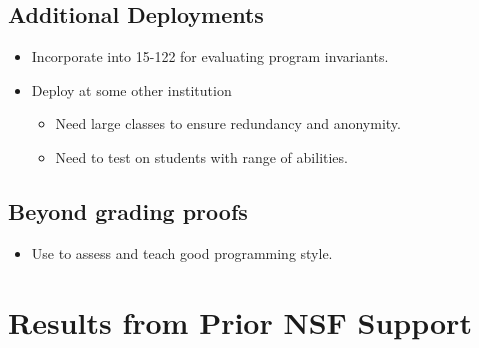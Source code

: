 \documentclass[12pt]{article}
\begin{document}
\subsection{Additional Deployments}

\begin{itemize}
\item Incorporate into 15-122 for evaluating program invariants.  
\item Deploy at some other institution
\begin{itemize}
\item Need large classes to ensure redundancy and anonymity.
\item Need to test on students with range of abilities.
\end{itemize}
\end{itemize}

\subsection{Beyond grading proofs}

\begin{itemize}
\item Use to assess and teach good programming style.
\end{itemize}

\section{Results from Prior NSF Support}


\end{document}
